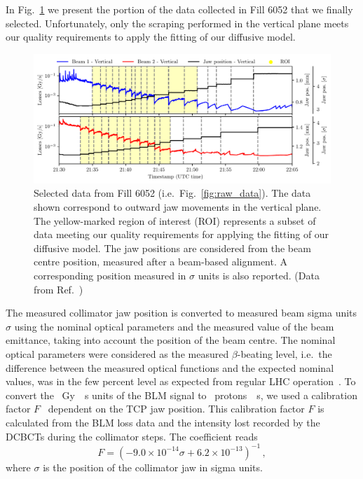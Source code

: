 In Fig.~\ref{fig:first} we present the portion of the data collected in Fill 6052 that we finally selected. Unfortunately, only the scraping performed in the vertical plane meets our quality requirements to apply the fitting of our diffusive model.

\begin{figure}[thp]
    \centering
    \includegraphics[width=\textwidth]{5_Diffusion_measurement_LHC/figs/first.pdf}
    \caption{Selected data from Fill 6052 (i.e.\ Fig.~\ref{fig:raw_data}). The data shown correspond to outward jaw movements in the vertical plane. The yellow-marked region of interest (ROI) represents a subset of data meeting our quality requirements for applying the fitting of our diffusive model. The jaw positions are considered from the beam centre position, measured after a beam-based alignment. A corresponding position measured in $\sigma$ units is also reported. (Data from Ref.~\cite{PhysRevAccelBeams.23.044802})}
    \label{fig:first}
\end{figure}

The measured collimator jaw position is converted to measured beam sigma units $\sigma$ using the nominal optical parameters and the measured value of the beam emittance, taking into account the position of the beam centre. The nominal optical parameters were considered as the measured $\beta$-beating level, i.e.\ the difference between the measured optical functions and the expected nominal values, was in the few percent level as expected from regular LHC operation~\cite{PhysRevAccelBeams.20.054801}.  To convert the \SI{}{Gy \per s} units of the BLM signal to \SI{}{protons \per s}, we used a calibration factor $F$~\cite{arek} dependent on the TCP jaw position. This calibration factor $F$ is calculated from the BLM loss data and the intensity lost recorded by the DCBCTs during the collimator steps. The coefficient reads 
\begin{equation}
    F = \left(-9.0\times10^{-14}\sigma + 6.2\times10^{-13}\right)^{-1} \,,
\end{equation}
where $\sigma$ is the position of the collimator jaw in sigma units.

